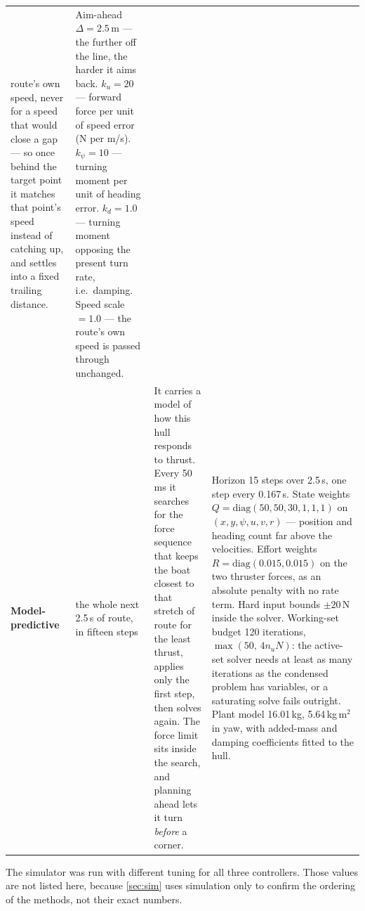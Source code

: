 \documentclass[11pt]{article}
\newcommand{\ctrl}[1]{\textbf{#1}}
\begin{document}
\begin{table}[H]
\begin{tabularx}{\linewidth}{@{} L{1.7cm} Y Y L{5.0cm} @{}}
route's own speed, never for a speed that would close a gap --- so once behind the target
point it matches that point's speed instead of catching up, and settles into a fixed
trailing distance. &
Aim-ahead $\Delta = 2.5$\,m --- the further off the line, the harder it aims
back.\newline
$k_u = 20$ --- forward force per unit of speed error (N per m/s).\newline
$k_\psi = 10$ --- turning moment per unit of heading error.\newline
$k_d = 1.0$ --- turning moment opposing the present turn rate, i.e.\ damping.\newline
Speed scale $= 1.0$ --- the route's own speed is passed through unchanged. \\
\addlinespace
\ctrl{Model-predictive} &
the whole next 2.5\,s of route, in fifteen steps &
It carries a model of how this hull responds to thrust. Every 50\,ms it searches for the
force sequence that keeps the boat closest to that stretch of route for the least thrust,
applies only the first step, then solves again. The force limit sits inside the search, and
planning ahead lets it turn \emph{before} a corner. &
Horizon 15 steps over 2.5\,s, one step every 0.167\,s.\newline
State weights $Q = \mathrm{diag}(50,50,30,1,1,1)$ on $(x, y, \psi, u, v, r)$ --- position and
heading count far above the velocities.\newline
Effort weights $R = \mathrm{diag}(0.015, 0.015)$ on the two thruster forces, as an absolute
penalty with no rate term.\newline
Hard input bounds $\pm20$\,N inside the solver.\newline
Working-set budget 120 iterations, $\max(50,\,4 n_u N)$: the active-set solver needs at least
as many iterations as the condensed problem has variables, or a saturating solve fails
outright.\newline
Plant model 16.01\,kg, 5.64\,kg\,m$^2$ in yaw, with added-mass and damping coefficients
fitted to the hull. \\
\bottomrule
\end{tabularx}
\end{table}

The simulator was run with different tuning for all three controllers. Those values are not
listed here, because \cref{sec:sim} uses simulation only to confirm the ordering of the
methods, not their exact numbers.

\end{document}
